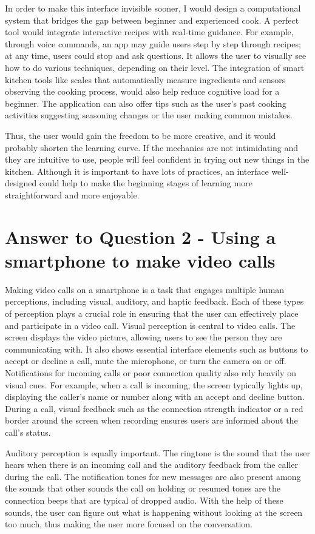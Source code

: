 \documentclass[
	letterpaper, %
]{jdf}
\begin{document}
In order to make this interface invisible sooner, I would design a computational system that bridges the gap between beginner and experienced cook. A perfect tool would integrate interactive recipes with real-time guidance. For example, through voice commands, an app may guide users step by step through recipes; at any time, users could stop and ask questions. It allows the user to visually see how to do various techniques, depending on their level. The integration of smart kitchen tools like scales that automatically measure ingredients and sensors observing the cooking process, would also help reduce cognitive load for a beginner. The application can also offer tips such as the user's past cooking activities suggesting seasoning changes or the user making common mistakes. 

Thus, the user would gain the freedom to be more creative, and it would probably shorten the learning curve. If the mechanics are not intimidating and they are intuitive to use, people will feel confident in trying out new things in the kitchen. Although it is important to have lots of practices, an interface well-designed could help to make the beginning stages of learning more straightforward and more enjoyable.
\newpage

\section{Answer to Question 2 - Using a smartphone to make video calls }
Making video calls on a smartphone is a task that engages multiple human perceptions, including visual, auditory, and haptic feedback. Each of these types of perception plays a crucial role in ensuring that the user can effectively place and participate in a video call. Visual perception is central to video calls. The screen displays the video picture, allowing users to see the person they are communicating with. It also shows essential interface elements such as buttons to accept or decline a call, mute the microphone, or turn the camera on or off. Notifications for incoming calls or poor connection quality also rely heavily on visual cues. For example, when a call is incoming, the screen typically lights up, displaying the caller's name or number along with an accept and decline button. During a call, visual feedback such as the connection strength indicator or a red border around the screen when recording ensures users are informed about the call’s status.

Auditory perception is equally important. The ringtone is the sound that the user hears when there is an incoming call and the auditory feedback from the caller during the call. The notification tones for new messages are also present among the sounds that other sounds the call on holding or resumed tones are the connection beeps that are typical of dropped audio. With the help of these sounds, the user can figure out what is happening without looking at the screen too much, thus making the user more focused on the conversation.
\end{document}
